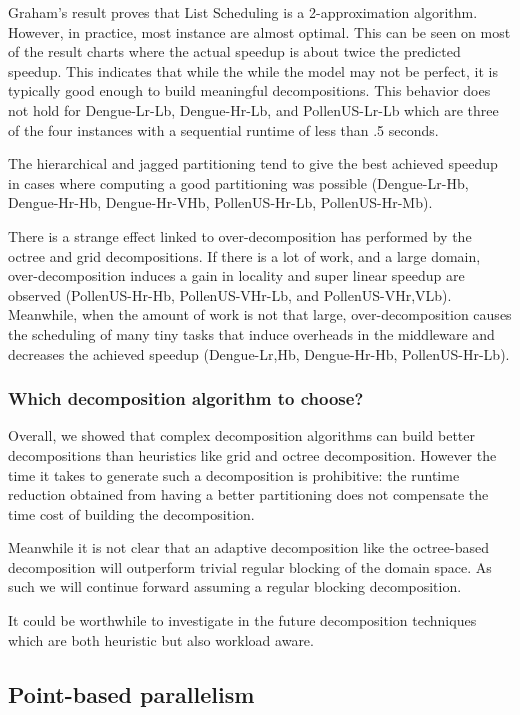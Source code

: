 \documentclass{article}
\begin{document}
Graham's result proves that List Scheduling is a 2-approximation
algorithm. However, in practice, most instance are almost
optimal. This can be seen on most of the result charts where the
actual speedup is about twice the predicted speedup. This indicates
that while the while the model may not be perfect, it is typically
good enough to build meaningful decompositions. This behavior does not
hold for Dengue-Lr-Lb, Dengue-Hr-Lb, and PollenUS-Lr-Lb which are
three of the four instances with a sequential runtime of less than .5
seconds.

The hierarchical and jagged partitioning tend to give the best
achieved speedup in cases where computing a good partitioning was
possible (Dengue-Lr-Hb, Dengue-Hr-Hb, Dengue-Hr-VHb, PollenUS-Hr-Lb,
PollenUS-Hr-Mb).

There is a strange effect linked to over-decomposition has performed
by the octree and grid decompositions. If there is a lot of work, and
a large domain, over-decomposition induces a gain in locality and
super linear speedup are observed (PollenUS-Hr-Hb, PollenUS-VHr-Lb, and
PollenUS-VHr,VLb). Meanwhile, when the amount of work is not that
large, over-decomposition causes the scheduling of many tiny tasks
that induce overheads in the middleware and decreases the achieved
speedup (Dengue-Lr,Hb, Dengue-Hr-Hb, PollenUS-Hr-Lb).

\subsubsection{Which decomposition algorithm to choose?}

Overall, we showed that complex decomposition algorithms can build
better decompositions than heuristics like grid and octree
decomposition. However the time it takes to generate such a
decomposition is prohibitive: the runtime reduction obtained from
having a better partitioning does not compensate the time cost of
building the decomposition.

Meanwhile it is not clear that an adaptive decomposition like the
octree-based decomposition will outperform trivial regular blocking of
the domain space. As such we will continue forward assuming a regular
blocking decomposition.

It could be worthwhile to investigate in the future decomposition
techniques which are both heuristic but also workload aware.

\subsection{Point-based parallelism}
\end{document}
